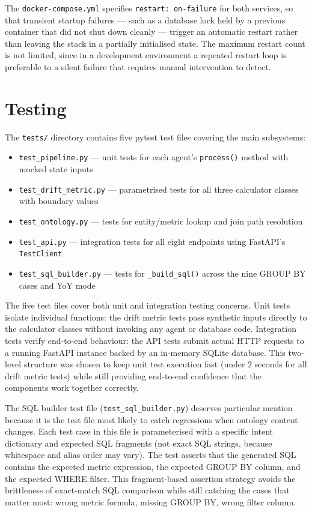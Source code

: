 \documentclass[12pt,a4paper]{report}
\begin{document}
The \texttt{docker-compose.yml} specifies \texttt{restart: on-failure} for both services, so that transient startup failures — such as a database lock held by a previous container that did not shut down cleanly — trigger an automatic restart rather than leaving the stack in a partially initialised state. The maximum restart count is not limited, since in a development environment a repeated restart loop is preferable to a silent failure that requires manual intervention to detect.

\section{Testing}
\label{sec:testing-impl}

The \texttt{tests/} directory contains five pytest test files covering the main subsystems:

\begin{itemize}[leftmargin=2em]
  \item \texttt{test\_pipeline.py} — unit tests for each agent's \texttt{process()} method with mocked state inputs
  \item \texttt{test\_drift\_metric.py} — parametrised tests for all three calculator classes with boundary values
  \item \texttt{test\_ontology.py} — tests for entity/metric lookup and join path resolution
  \item \texttt{test\_api.py} — integration tests for all eight endpoints using FastAPI's \texttt{TestClient}
  \item \texttt{test\_sql\_builder.py} — tests for \texttt{\_build\_sql()} across the nine GROUP BY cases and YoY mode
\end{itemize}

The five test files cover both unit and integration testing concerns. Unit tests isolate individual functions: the drift metric tests pass synthetic inputs directly to the calculator classes without invoking any agent or database code. Integration tests verify end-to-end behaviour: the API tests submit actual HTTP requests to a running FastAPI instance backed by an in-memory SQLite database. This two-level structure was chosen to keep unit test execution fast (under 2 seconds for all drift metric tests) while still providing end-to-end confidence that the components work together correctly.

The SQL builder test file (\texttt{test\_sql\_builder.py}) deserves particular mention because it is the test file most likely to catch regressions when ontology content changes. Each test case in this file is parameterised with a specific intent dictionary and expected SQL fragments (not exact SQL strings, because whitespace and alias order may vary). The test asserts that the generated SQL contains the expected metric expression, the expected GROUP BY column, and the expected WHERE filter. This fragment-based assertion strategy avoids the brittleness of exact-match SQL comparison while still catching the cases that matter most: wrong metric formula, missing GROUP BY, wrong filter column.
\end{document}
